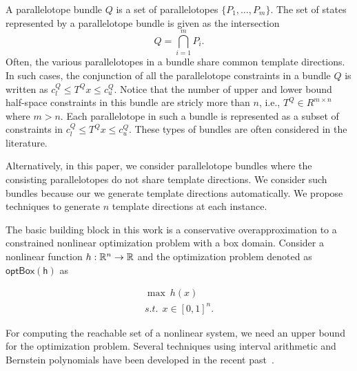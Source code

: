 A parallelotope bundle $Q$ is a set of parallelotopes $\{P_1, \ldots, P_m\}$.
%
The set of states represented by a parallelotope bundle is given as the intersection
\begin{equation}
Q = \bigcap_{i=1}^m P_i.
\end{equation}
%
Often, the various parallelotopes in a bundle share common template directions.
%
In such cases, the conjunction of all the parallelotope constraints in a bundle $Q$ is written as $c_{l}^Q \leq T^Q x \leq c_{u}^Q$.
%
Notice that the number of upper and lower bound half-space constraints in this bundle are stricly more than $n$, i.e., $T^Q \in R^{m \times n}$ where $m>n$.
%
Each parallelotope in such a bundle is represented as a subset of constraints in $c_{l}^Q \leq T^Q x \leq c_{u}^Q$.
%
These types of bundles are often considered in the literature.


Alternatively, in this paper, we consider parallelotope bundles where the consisting parallelotopes do not share template directions.
%
We consider such bundles because our we generate template directions automatically.
%
We propose techniques to generate $n$ template directions at each instance.
%



The basic building block in this work is a conservative overapproximation to a constrained nonlinear optimization problem with a box domain.
%
Consider a nonlinear function $h : \reals^n \rightarrow \reals$ and the optimization problem denoted as $\mathsf{optBox(h)}$ as

\begin{eqnarray}
  \max ~ h(x) \label{eq:maxsup}\\
  s.t. ~~ x \in [0,1]^{n}.\nonumber
\end{eqnarray}

For computing the reachable set of a nonlinear system, we need an upper bound for the optimization problem.
%
Several techniques using interval arithmetic and Bernstein polynomials have been developed in the recent past~\cite{garloff2003bernstein,munoz2013formalization,kodiak,smith2009fast}.
%


